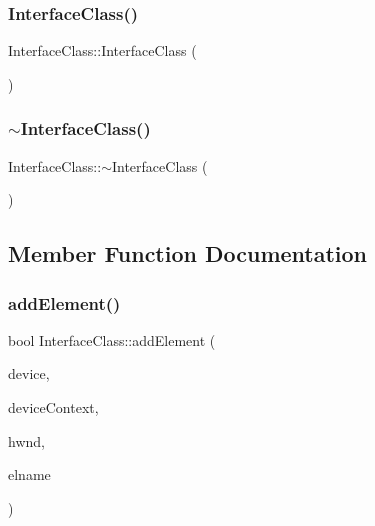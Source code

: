 \subsubsection{\texorpdfstring{Interface\+Class()}{InterfaceClass()}\hspace{0.1cm}{\footnotesize\ttfamily [2/2]}}
{\footnotesize\ttfamily Interface\+Class\+::\+Interface\+Class (\begin{DoxyParamCaption}\item[{const \hyperlink{class_interface_class}{Interface\+Class} \&}]{ }\end{DoxyParamCaption})}

\mbox{\label{class_interface_class_a54008c20f1b9ec01852a9a28732b263b}} 
\subsubsection{\texorpdfstring{$\sim$\+Interface\+Class()}{~InterfaceClass()}}
{\footnotesize\ttfamily Interface\+Class\+::$\sim$\+Interface\+Class (\begin{DoxyParamCaption}{ }\end{DoxyParamCaption})}



\subsection{Member Function Documentation}
\mbox{\label{class_interface_class_a54ca6130ae5cf8f7d1d82ccbe729d731}} 
\subsubsection{\texorpdfstring{add\+Element()}{addElement()}}
{\footnotesize\ttfamily bool Interface\+Class\+::add\+Element (\begin{DoxyParamCaption}\item[{I\+D3\+D11\+Device $\ast$}]{device,  }\item[{I\+D3\+D11\+Device\+Context $\ast$}]{device\+Context,  }\item[{H\+W\+ND}]{hwnd,  }\item[{const std\+::string \&}]{elname }\end{DoxyParamCaption})}


